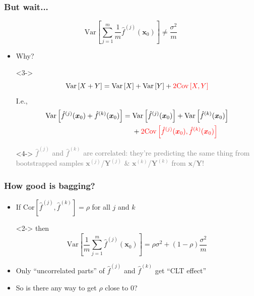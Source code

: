 \documentclass[xcolor={dvipsnames}]{beamer}
\begin{document}
\frame
{
\frametitle{But wait...}

$$\text{Var}\left[\sum_{j=1}^m \frac{1}{m} \hat f^{(j)}({\boldsymbol x}_0)\right] \not = \frac{\sigma^2}{m}$$

\begin{itemize}
\item<2-> Why?
\item[]<3-> 
$$\text{Var}\left[X + Y\right] = \text{Var}\left[X\right] + \text{Var}\left[Y\right] + \textcolor{red}{2 \text{Cov}\left[X, Y\right]}$$
I.e.,
\begin{align*}
\text{Var}\left[\hat f^{(j)}({\boldsymbol x}_0) + \hat f^{(k)}({\boldsymbol x}_0)\right] = {}& \text{Var}\left[\hat f^{(j)}({\boldsymbol x}_0)\right] + \text{Var}\left[\hat f^{(k)}({\boldsymbol x}_0)\right] \\
{}& + \textcolor{red}{2 \text{Cov}\left[\hat f^{(j)}({\boldsymbol x}_0), \hat f^{(k)}({\boldsymbol x}_0)\right]}
\end{align*}

\item[]
\item[]<4->{\textcolor{gray}{
$\hat f^{(j)}$ and $\hat f^{(k)}$ are correlated: they're predicting the same thing
from bootstrapped samples ${\boldsymbol x}^{(j)}$/${\boldsymbol Y}^{(j)}$ \& 
${\boldsymbol x}^{(k)}$/${\boldsymbol Y}^{(k)}$ from ${\boldsymbol x}$/${\boldsymbol Y}$!}} 
 
\end{itemize}
}


\frame
{
\frametitle{How good is bagging?}

\begin{itemize}
\item<1-> If Cor$\left[\hat f^{(j)}, \hat f^{(k)}\right] = \rho$ for all $j$ and $k$
\item[]<2-> then
$$\text{Var}\left[\frac{1}{m}\sum_{j=1}^m \hat f^{(j)}({\boldsymbol x}_0)\right] = \rho \sigma^2 + (1 - \rho)\frac{\sigma^2}{m}$$

\item<3-> Only ``uncorrelated parts'' of $\hat f^{(j)}$ and $\hat f^{(k)}$ get ``CLT effect''
\item[]
\item<4-> So is there any way to get $\rho$ close to 0?
\end{itemize}
}
\end{document}

